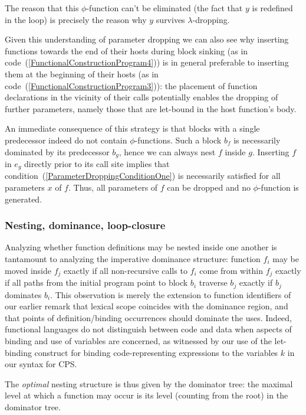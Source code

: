 The reason that this $\phi$-function can't be eliminated (the fact
that $y$ is redefined in the loop) is precisely the reason why $y$
survives $\lambda$-dropping.

Given this understanding of parameter dropping we can also see why
inserting functions towards the end of their hosts during block
sinking (as in code~(\ref{FunctionalConstructionProgram4})) is in
general preferable to inserting them at the beginning of their hosts
(as in code~(\ref{FunctionalConstructionProgram3})): the placement of
function declarations in the vicinity of their calls potentially
enables the dropping of further parameters, namely those that are
let-bound in the host function's body.

An immediate consequence of this strategy is that blocks with a single
predecessor indeed do not contain $\phi$-functions. Such a block $b_f$
is necessarily dominated by its predecessor $b_g$, hence we can always
nest $f$ inside $g$. Inserting $f$ in $e_g$ directly prior to its call
site implies that condition~(\ref{ParameterDroppingConditionOne}) is
necessarily satisfied for all parameters $x$ of $f$. Thus, all
parameters of $f$ can be dropped and no $\phi$-function is generated.

\subsubsection{Nesting, dominance, loop-closure}
\label{section:semantics:loopclosure}
Analyzing whether function definitions may be nested inside one
another is tantamount to analyzing the imperative dominance structure:
function $f_i$ may be moved inside $f_j$ exactly if all non-recursive
calls to $f_i$ come from within $f_j$ exactly if all paths from the
initial program point to block $b_i$ traverse $b_j$ exactly if $b_j$
dominates $b_i$.  This observation is merely the extension to function
identifiers of our earlier remark that lexical scope coincides with
the dominance region, and that points of definition/binding
occurrences should dominate the uses. Indeed, functional languages do
not distinguish between code and data when aspects of binding and use
of variables are concerned, as witnessed by our use of the let-binding
construct for binding code-representing expressions to the variables
$k$ in our syntax for CPS. 

The \emph{optimal} nesting structure is thus given by the dominator
tree: the maximal level at which a function may occur is its level
(counting from the root) in the dominator tree.

